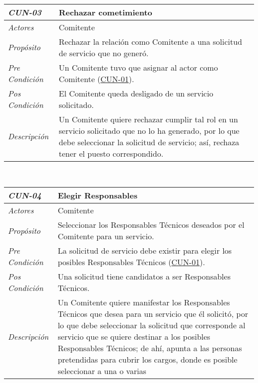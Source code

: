 \begin{center}
{\begin{tabular}{ | p{3cm} | p{12.5cm} | }
	\hline
\end{tabular}} \\[1cm]
\hypertarget{CUN-03}{%
\begin{tabular}{ | p{3cm} | p{12.5cm} | }
	\hline
	\rowcolor{lightgray}
	\hfil \textbf{\textit{CUN-03}} &
	\hfil \textbf{Rechazar cometimiento} \\
	\hline
	\raggedleft \textit{Actores} & Comitente \\
	\hline
	\raggedleft \textit{Prop\'osito} & Rechazar la
	relaci\'on como Comitente a una solicitud de
	servicio que no gener\'o. \\
	\hline
	\raggedleft \textit{Pre Condici\'on} & Un Comitente
	tuvo que asignar al actor como Comitente
	(\hyperlink{CUN-01}{CUN-01}). \\
	\hline
	\raggedleft \textit{Pos Condici\'on} & El Comitente
	queda desligado de un servicio solicitado. \\
	\hline
	\raggedleft \textit{Descripci\'on} &
	Un Comitente quiere rechazar cumplir tal rol en un servicio
	solicitado que no lo ha generado, por lo que debe
	seleccionar la solicitud de servicio; as\'i, rechaza tener
	el puesto correspondido. \\
	\hline
\end{tabular}} \\[1cm]
\hypertarget{CUN-04}{%
\begin{tabular}{ | p{3cm} | p{12.5cm} | }
	\hline
	\rowcolor{lightgray}
	\hfil \textbf{\textit{CUN-04}} &
	\hfil \textbf{Elegir Responsables} \\
	\hline
	\raggedleft \textit{Actores} & Comitente \\
	\hline
	\raggedleft \textit{Prop\'osito} & Seleccionar
	los Responsables T\'ecnicos deseados por el
	Comitente para un servicio. \\
	\hline
	\raggedleft \textit{Pre Condici\'on} & La solicitud
	de servicio debe existir para elegir los posibles
	Responsables T\'ecnicos
	(\hyperlink{CUN-01}{CUN-01}). \\
	\hline
	\raggedleft \textit{Pos Condici\'on} & Una solicitud
	tiene candidatos a ser Responsables T\'ecnicos. \\
	\hline
	\raggedleft \textit{Descripci\'on} &
	Un Comitente quiere manifestar los Responsables
	T\'ecnicos que desea para un servicio que \'el
	solicit\'o, por lo que debe seleccionar la solicitud
	que corresponde al servicio que se quiere destinar a
	los posibles Responsables T\'ecnicos; de ah\'i,
	apunta a las personas pretendidas para cubrir los
	cargos, donde es posible seleccionar a una o varias

\end{tabular}}
\end{center}
